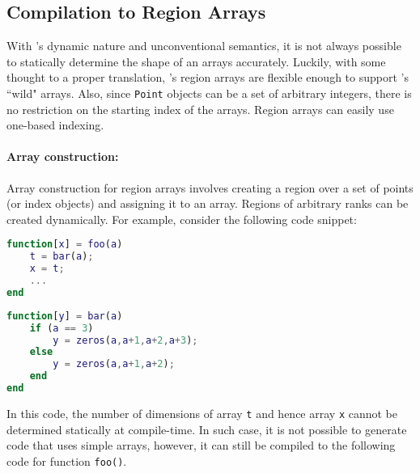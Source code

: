 \subsection{Compilation to Region Arrays}

With \matlab's dynamic nature and unconventional semantics, it is not
always possible to statically determine the shape of an arrays 
accurately.  Luckily, with some thought to a proper translation, \xten's
region arrays are flexible enough to support \matlab's ``wild" arrays.
Also, since \verb|Point| objects can be a set of arbitrary integers,
there is no restriction on the starting index of the arrays. Region
arrays can easily use one-based indexing. 

\paragraph{Array construction:}
Array construction for region arrays involves creating a region over a set of
points (or index objects) and assigning it to an array. Regions of arbitrary
ranks can be created dynamically.  
For example, consider the following \matlab code snippet:

\begin{minipage}{0.4\linewidth}
\begin{lstlisting}[language=Matlab,numbers=none]                                
function[x] = foo(a)                                                        
    t = bar(a);  
    x = t;
    ...	                                                                    
end      
\end{lstlisting}  
\end{minipage}
\hfill
\hspace{.5cm}
\hfill
\begin{minipage}{0.5\linewidth}
\begin{lstlisting}[language=Matlab,numbers=none]                                
function[y] = bar(a)
    if (a == 3)
        y = zeros(a,a+1,a+2,a+3);
    else
        y = zeros(a,a+1,a+2);
    end
end		                                                           
\end{lstlisting}  
\end{minipage}

\noindent
In this code, the number of dimensions of array \verb|t| and hence array
\verb|x| cannot be determined statically at compile-time. In such case, it is 
not possible to generate \xten code that uses simple arrays, however, it can 
still be compiled to the following \xten code for function \verb|foo()|.

